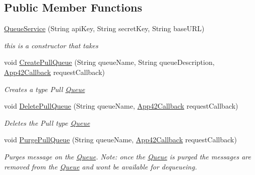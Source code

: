 \subsection*{Public Member Functions}
\begin{DoxyCompactItemize}
\item 
\hyperlink{classcom_1_1shephertz_1_1app42_1_1paas_1_1sdk_1_1windows_1_1message_1_1_queue_service_ae57eb384b7d4615a7b66f2564f864711}{Queue\+Service} (String api\+Key, String secret\+Key, String base\+U\+R\+L)
\begin{DoxyCompactList}\small\item\em this is a constructor that takes \end{DoxyCompactList}\item 
void \hyperlink{classcom_1_1shephertz_1_1app42_1_1paas_1_1sdk_1_1windows_1_1message_1_1_queue_service_af69adade5ad6cb36c8581156451b3757}{Create\+Pull\+Queue} (String queue\+Name, String queue\+Description, \hyperlink{interfacecom_1_1shephertz_1_1app42_1_1paas_1_1sdk_1_1windows_1_1_app42_callback}{App42\+Callback} request\+Callback)
\begin{DoxyCompactList}\small\item\em Creates a type Pull \hyperlink{classcom_1_1shephertz_1_1app42_1_1paas_1_1sdk_1_1windows_1_1message_1_1_queue}{Queue} \end{DoxyCompactList}\item 
void \hyperlink{classcom_1_1shephertz_1_1app42_1_1paas_1_1sdk_1_1windows_1_1message_1_1_queue_service_aab7927f2c04fff25aecdd099727ef213}{Delete\+Pull\+Queue} (String queue\+Name, \hyperlink{interfacecom_1_1shephertz_1_1app42_1_1paas_1_1sdk_1_1windows_1_1_app42_callback}{App42\+Callback} request\+Callback)
\begin{DoxyCompactList}\small\item\em Deletes the Pull type \hyperlink{classcom_1_1shephertz_1_1app42_1_1paas_1_1sdk_1_1windows_1_1message_1_1_queue}{Queue} \end{DoxyCompactList}\item 
void \hyperlink{classcom_1_1shephertz_1_1app42_1_1paas_1_1sdk_1_1windows_1_1message_1_1_queue_service_af3cc79f1d6f20e5849a73aeaf5e05c22}{Purge\+Pull\+Queue} (String queue\+Name, \hyperlink{interfacecom_1_1shephertz_1_1app42_1_1paas_1_1sdk_1_1windows_1_1_app42_callback}{App42\+Callback} request\+Callback)
\begin{DoxyCompactList}\small\item\em Purges message on the \hyperlink{classcom_1_1shephertz_1_1app42_1_1paas_1_1sdk_1_1windows_1_1message_1_1_queue}{Queue}. Note\+: once the \hyperlink{classcom_1_1shephertz_1_1app42_1_1paas_1_1sdk_1_1windows_1_1message_1_1_queue}{Queue} is purged the messages are removed from the \hyperlink{classcom_1_1shephertz_1_1app42_1_1paas_1_1sdk_1_1windows_1_1message_1_1_queue}{Queue} and wont be available for dequeueing. \end{DoxyCompactList}\item 

\end{DoxyCompactItemize}
